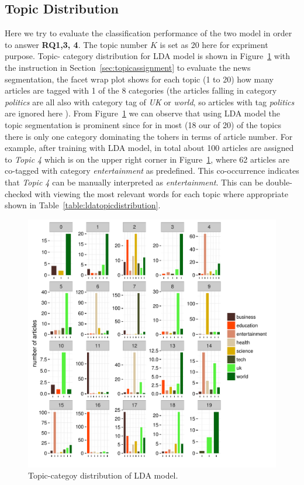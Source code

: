 \subsection{Topic Distribution}\label{ldadat_td}
Here we try to evaluate the classification performance of the two model in order to answer \textbf{RQ1,3, 4}. The topic number $K$ is set as 20 here for expriment purpose. Topic- category distribution for LDA model is shown in Figure~\ref{fig:lda_with_weights} with the instruction in Section~\ref{sec:topicassignment} to evaluate the news segmentation, the facet wrap plot shows for each topic (1 to 20) how many articles are tagged with 1 of the 8 categories (the articles falling in category \textit{politics} are all also with category tag of \textit{UK} or \textit{world}, so articles with tag \textit{politics} are ignored here  ). From Figure~\ref{fig:lda_with_weights} we can observe that using LDA model the topic segmentation is prominent since for in most (18 our of 20) of the topics there is only one category dominating the tohers in terms of article number. For example, after training with LDA model, in total about 100 articles are assigned to \textit{Topic 4} which is on the upper right corner in Figure~\ref{fig:lda_with_weights}, where 62 articles are co-tagged with category \textit{entertainment} as predefined. This co-occurrence indicates that \textit{Topic 4} can be manually interpreted as \textit{entertainment}. This can be double-checked with viewing the most relevant words for each topic where appropriate shown in Table~\ref{table:ldatopicdistribution}.
\begin{figure}[h]
\centering
\includegraphics[width=1\textwidth]{figures/lda_with_weights.pdf}
\caption{Topic-categoy distribution of LDA model.}
\label{fig:lda_with_weights}
\end{figure}

